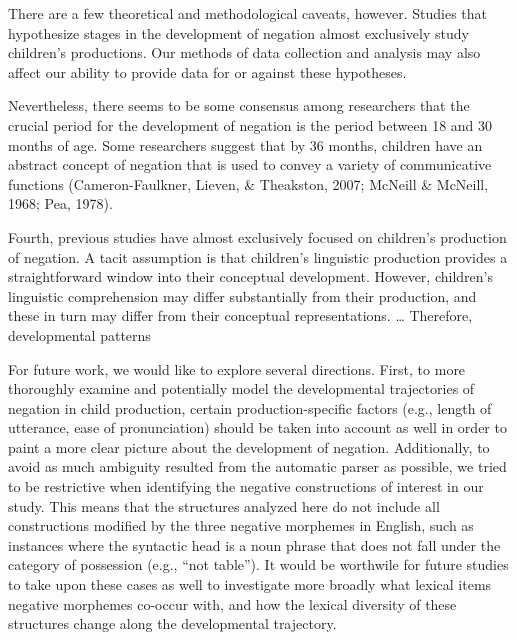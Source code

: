 \documentclass[
  english,
  man,floatsintext]{apa6}
\begin{document}
There are a few theoretical and methodological caveats, however. Studies that hypothesize stages in the development of negation almost exclusively study children's productions. Our methods of data collection and analysis may also affect our ability to provide data for or against these hypotheses.

Nevertheless, there seems to be some consensus among researchers that the crucial period for the development of negation is the period between 18 and 30 months of age. Some researchers suggest that by 36 months, children have an abstract concept of negation that is used to convey a variety of communicative functions (Cameron-Faulkner, Lieven, \& Theakston, 2007; McNeill \& McNeill, 1968; Pea, 1978).

Fourth, previous studies have almost exclusively focused on children's production of negation. A tacit assumption is that children's linguistic production provides a straightforward window into their conceptual development. However, children's linguistic comprehension may differ substantially from their production, and these in turn may differ from their conceptual representations. \ldots{} Therefore, developmental patterns

For future work, we would like to explore several directions. First, to more thoroughly examine and potentially model the developmental trajectories of negation in child production, certain production-specific factors (e.g., length of utterance, ease of pronunciation) should be taken into account as well in order to paint a more clear picture about the development of negation. Additionally, to avoid as much ambiguity resulted from the automatic parser as possible, we tried to be restrictive when identifying the negative constructions of interest in our study. This means that the structures analyzed here do not include all constructions modified by the three negative morphemes in English, such as instances where the syntactic head is a noun phrase that does not fall under the category of possession (e.g., ``not table''). It would be worthwile for future studies to take upon these cases as well to investigate more broadly what lexical items negative morphemes co-occur with, and how the lexical diversity of these structures change along the developmental trajectory.

\begingroup
\setlength{\parindent}{-0.5in}
\setlength{\leftskip}{0.5in}

\endgroup
\end{document}
